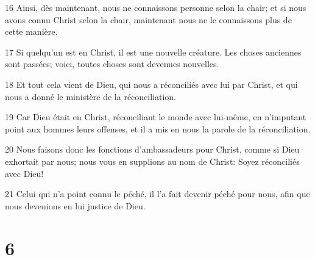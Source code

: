 \par 16 Ainsi, dès maintenant, nous ne connaissons personne selon la chair; et si nous avons connu Christ selon la chair, maintenant nous ne le connaissons plus de cette manière.
\par 17 Si quelqu'un est en Christ, il est une nouvelle créature. Les choses anciennes sont passées; voici, toutes choses sont devenues nouvelles.
\par 18 Et tout cela vient de Dieu, qui nous a réconciliés avec lui par Christ, et qui nous a donné le ministère de la réconciliation.
\par 19 Car Dieu était en Christ, réconciliant le monde avec lui-même, en n'imputant point aux hommes leurs offenses, et il a mis en nous la parole de la réconciliation.
\par 20 Nous faisons donc les fonctions d'ambassadeurs pour Christ, comme si Dieu exhortait par nous; nous vous en supplions au nom de Christ: Soyez réconciliés avec Dieu!
\par 21 Celui qui n'a point connu le péché, il l'a fait devenir péché pour nous, afin que nous devenions en lui justice de Dieu.

\chapter{6}

